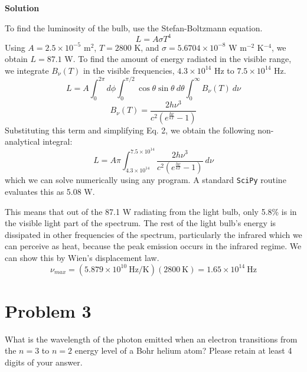 \documentclass[12pt]{article}
\begin{document}
\setcounter{equation}{0}
\vspace{0.5cm}
\begin{adjustwidth}{2.5em}{0pt}
\begin{siderules}
 {\color{blue} \textbf{Solution}
 
To find the luminosity of the bulb, use the Stefan-Boltzmann equation.
\begin{equation}
L = A\sigma T^4
\end{equation}
Using $A = 2.5 \times 10^{-5}$ m$^2$, $T = 2800$ K, and $\sigma = 5.6704 \times 10^{-8}$ W m$^{-2}$ K$^{-4}$, we obtain $L = 87.1$ W.
To find the amount of energy radiated in the visible range, we integrate $B_{\nu}(T)$ in the visible frequencies, $4.3 \times 10^{14}$ Hz to $7.5 \times 10^{14}$ Hz.
\begin{equation}
L = A \int_{0}^{2\pi} d\phi \int_{0}^{\pi/2} \cos \theta \sin \theta ~d\theta \int_{0}^{\infty} B_{\nu}(T) ~d\nu
\end{equation}
\begin{equation}
B_{\nu}(T) = \frac{2h\nu^3}{c^2\left(e^{\frac{h\nu}{kT}}-1 \right)}
\end{equation}
Substituting this term and simplifying Eq. 2, we obtain the following non-analytical integral:
\begin{equation}
L = A\pi \int_{4.3\times 10^{14}}^{7.5\times 10^{14}} \frac{2h\nu^3}{c^2\left(e^{\frac{h\nu}{kT}}-1 \right)} ~d\nu
\end{equation}
which we can solve numerically using any program. A standard \texttt{SciPy} routine evaluates this as 5.08 W.

This means that out of the 87.1 W radiating from the light bulb, only 5.8\% is in the visible light part of the spectrum. The rest of the light bulb's energy is dissipated in other frequencies of the spectrum, particularly the infrared which we can perceive as heat, because the peak emission occurs in the infrared regime. We can show this by Wien's displacement law.
\begin{equation}
\nu_{max} = (5.879 \times 10^{10} ~\text{Hz/K})(2800 ~\text{K}) = 1.65 \times 10^{14} ~\text{Hz}
\end{equation}
 }
\end{siderules}
\end{adjustwidth}

\section*{Problem 3}
What is the wavelength of the photon emitted when an electron transitions from the $n = 3$ to $n = 2$ energy level of a Bohr helium atom? Please retain at least 4 digits of your answer.
\end{document}

